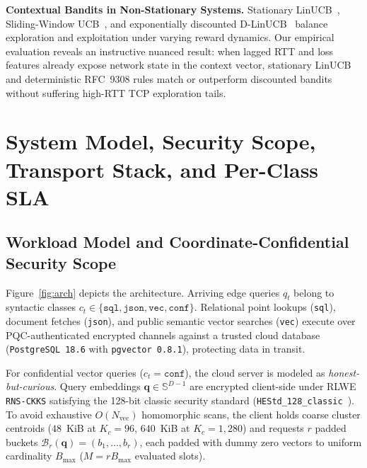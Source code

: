 \documentclass[10pt,journal,compsoc]{IEEEtran}
\begin{document}
\smallskip\noindent \textbf{Contextual Bandits in Non-Stationary Systems.} Stationary LinUCB~\cite{li2010linucb}, Sliding-Window UCB~\cite{garivier2011swucb}, and exponentially discounted D-LinUCB~\cite{russac2019dlinucb} balance exploration and exploitation under varying reward dynamics. Our empirical evaluation reveals an instructive nuanced result: when lagged RTT and loss features already expose network state in the context vector, stationary LinUCB and deterministic RFC~9308 rules match or outperform discounted bandits without suffering high-RTT TCP exploration tails.


\section{System Model, Security Scope, Transport Stack, and Per-Class SLA}\label{sec:model}
\subsection{Workload Model and Coordinate-Confidential Security Scope}
Figure~\ref{fig:arch} depicts the architecture. Arriving edge queries $q_t$ belong to syntactic classes $c_t \in \{\texttt{sql}, \texttt{json}, \texttt{vec}, \texttt{conf}\}$. Relational point lookups (\texttt{sql}), document fetches (\texttt{json}), and public semantic vector searches (\texttt{vec}) execute over PQC-authenticated encrypted channels against a trusted cloud database (\texttt{PostgreSQL~18.6} with \texttt{pgvector~0.8.1}), protecting data in transit.

For confidential vector queries ($c_t = \texttt{conf}$), the cloud server is modeled as \emph{honest-but-curious}. Query embeddings $\mathbf{q} \in \mathbb{S}^{D-1}$ are encrypted client-side under RLWE \texttt{RNS-CKKS} satisfying the 128-bit classic security standard (\nolinkurl{HEStd_128_classic}~\cite{albadawi2022openfhe}). To avoid exhaustive $O(N_{\text{vec}})$ homomorphic scans, the client holds coarse cluster centroids ($48$~KiB at $K_c=96$, $640$~KiB at $K_c=1{,}280$) and requests $r$ padded buckets $\mathcal{B}_r(\mathbf{q}) = (b_1, \dots, b_r)$, each padded with dummy zero vectors to uniform cardinality $B_{\max}$ ($M = r B_{\max}$ evaluated slots).
\end{document}

